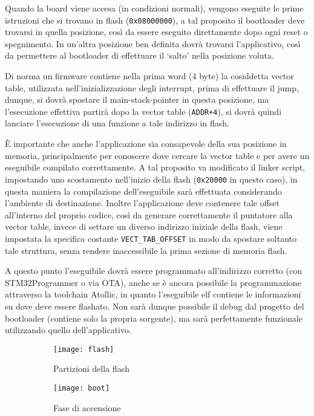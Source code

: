 Quando la board viene accesa (in condizioni normali), vengono eseguite le prime istruzioni che si trovano in flash (\texttt{0x08000000}), a tal proposito il bootloader deve trovarsi in quella posizione, cos\`i da essere eseguito direttamente dopo ogni reset o spegnimento. In un'altra posizione ben definita dovr\`a trovarsi l'applicativo, cos\`i da permettere al bootloader di effettuare il `salto' nella posizione voluta.

Di norma un firmware contiene nella prima word (4 byte) la cosiddetta vector table, utilizzata nell'inizializzazione degli interrupt, prima di effettuare il jump, dunque, si dovr\`a spostare il main-stack-pointer in questa posizione, ma l'esecuzione effettiva partir\`a dopo la vector table (\texttt{ADDR+4}), si dovr\`a quindi lanciare l'esecuzione di una funzione a tale indirizzo in flash.

\`E importante che anche l'applicazione sia consapevole della sua posizione in memoria, principalmente per conoscere dove cercare la vector table e per avere un eseguibile compilato correttamente. A tal proposito va modificato il linker script, impostando uno scostamento nell'inizio della flash (\texttt{0x20000} in questo caso), in questa maniera la compilazione dell'eseguibile sar\`a effettuata considerando l'ambiente di destinazione. Inoltre l'applicazione deve contenere tale offset all'interno del proprio codice, cos\`i da generare correttamente il puntatore alla vector table, invece di settare un diverso indirizzo iniziale della flash, viene impostata la specifica costante \texttt{VECT\_TAB\_OFFSET} in modo da spostare soltanto tale struttura, senza rendere inaccessibile la prima sezione di memoria flash.

A questo punto l'eseguibile dovr\`a essere programmato all'indirizzo corretto (con STM32Programmer o via OTA), anche se \`e ancora possibile la programmazione attraverso la toolchain Atollic, in quanto l'eseguibile elf contiene le informazioni su dove deve essere flashato. Non sar\`a dunque possibile il debug dal progetto del bootloader (contiene solo la propria sorgente), ma sar\`a perfettamente funzionale utilizzando quello dell'applicativo.

\begin{figure}[ht]
  \center
  \begin{subfigure}{.45\textwidth}
    \texttt{[image: flash]}
    \caption{Partizioni della flash}
  \end{subfigure}
  \hfill
  \begin{subfigure}{.45\textwidth}
    \texttt{[image: boot]}
    \caption{Fase di accensione}
  \end{subfigure}
  \caption{}
\end{figure}


